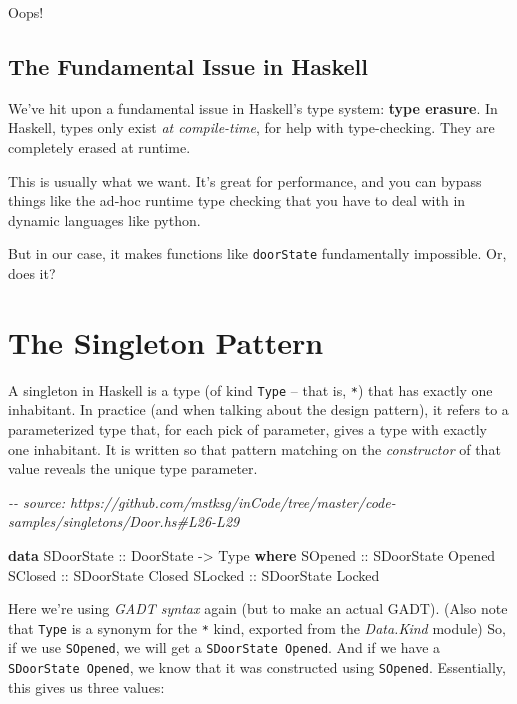 \documentclass[]{article}
\newenvironment{Shaded}{}{}
\newcommand{\CommentTok}[1]{\textcolor[rgb]{0.38,0.63,0.69}{\textit{#1}}}
\newcommand{\DataTypeTok}[1]{\textcolor[rgb]{0.56,0.13,0.00}{#1}}
\newcommand{\KeywordTok}[1]{\textcolor[rgb]{0.00,0.44,0.13}{\textbf{#1}}}
\newcommand{\OtherTok}[1]{\textcolor[rgb]{0.00,0.44,0.13}{#1}}
\begin{document}
Oops!

\subsection{The Fundamental Issue in
Haskell}\label{the-fundamental-issue-in-haskell}

We've hit upon a fundamental issue in Haskell's type system: \textbf{type
erasure}. In Haskell, types only exist \emph{at compile-time}, for help with
type-checking. They are completely erased at runtime.

This is usually what we want. It's great for performance, and you can bypass
things like the ad-hoc runtime type checking that you have to deal with in
dynamic languages like python.

But in our case, it makes functions like \texttt{doorState} fundamentally
impossible. Or, does it?

\section{The Singleton Pattern}\label{the-singleton-pattern}

A singleton in Haskell is a type (of kind \texttt{Type} -- that is, \texttt{*})
that has exactly one inhabitant. In practice (and when talking about the design
pattern), it refers to a parameterized type that, for each pick of parameter,
gives a type with exactly one inhabitant. It is written so that pattern matching
on the \emph{constructor} of that value reveals the unique type parameter.

\begin{Shaded}
\begin{Highlighting}[]
\CommentTok{{-}{-} source: https://github.com/mstksg/inCode/tree/master/code{-}samples/singletons/Door.hs\#L26{-}L29}

\KeywordTok{data} \DataTypeTok{SDoorState}\OtherTok{ ::} \DataTypeTok{DoorState} \OtherTok{{-}\textgreater{}} \DataTypeTok{Type} \KeywordTok{where}
    \DataTypeTok{SOpened}\OtherTok{ ::} \DataTypeTok{SDoorState} \DataTypeTok{\textquotesingle{}Opened}
    \DataTypeTok{SClosed}\OtherTok{ ::} \DataTypeTok{SDoorState} \DataTypeTok{\textquotesingle{}Closed}
    \DataTypeTok{SLocked}\OtherTok{ ::} \DataTypeTok{SDoorState} \DataTypeTok{\textquotesingle{}Locked}
\end{Highlighting}
\end{Shaded}

Here we're using \emph{GADT syntax} again (but to make an actual GADT). (Also
note that \texttt{Type} is a synonym for the \texttt{*} kind, exported from the
\emph{Data.Kind} module) So, if we use \texttt{SOpened}, we will get a
\texttt{SDoorState\ \textquotesingle{}Opened}. And if we have a
\texttt{SDoorState\ \textquotesingle{}Opened}, we know that it was constructed
using \texttt{SOpened}. Essentially, this gives us three values:
\end{document}
